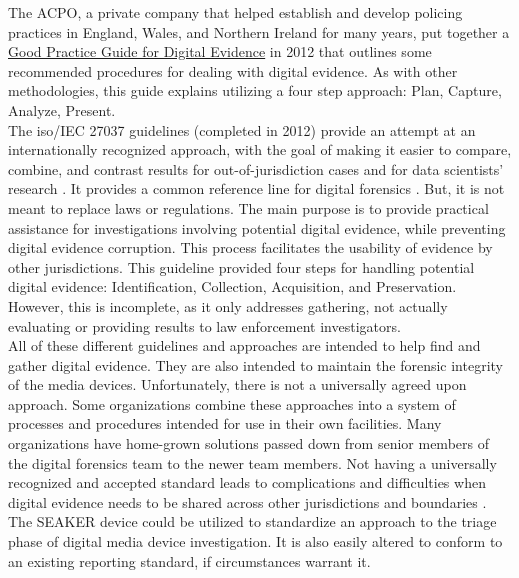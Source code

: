 \documentclass[12pt]{article}
\begin{document}
The ACPO, a private company that helped establish and
develop policing practices in England, Wales, and Northern Ireland for many years,
put together a \uline{Good Practice Guide for Digital Evidence} \cite{williams2012acpo} in 2012 that outlines some
recommended procedures for dealing with digital evidence.  As with other methodologies, this guide
explains utilizing a four step approach: Plan, Capture, Analyze, Present.\\

The \gls{iso}/IEC 27037 guidelines (completed in 2012) provide an attempt at an internationally 
recognized approach,
with the goal of making it easier to compare, combine, and contrast
results for out-of-jurisdiction cases and for data scientists' research \cite{ISO27037}.  It provides a
common reference line for 
digital forensics \cite{ajijola2014review}.  But, it is not meant to replace laws or regulations.
The main purpose is to provide practical
assistance for investigations involving potential digital evidence, while preventing digital
evidence corruption.  This
process facilitates the usability of evidence by other jurisdictions.  This guideline provided
four steps for handling
potential digital evidence: Identification, Collection, Acquisition, and Preservation.  However,
this is incomplete, as
it only addresses gathering, not actually evaluating or providing results to law enforcement
investigators.\\

All of these different guidelines and approaches are intended to help find and gather digital evidence.
They are also intended to maintain the forensic integrity of the media devices.  Unfortunately, there 
is not a universally agreed upon approach. Some organizations combine these approaches
into a system of processes and procedures intended for use in their own facilities.  
Many organizations have home-grown solutions passed down from senior members of the digital forensics
team to the newer team members.  Not having a universally recognized and accepted standard 
leads to complications and difficulties when digital evidence needs to be shared across other
jurisdictions and boundaries \cite{ajijola2014review}.\\

The SEAKER device could be utilized to standardize an approach to the triage phase of 
digital media device investigation.  It is also easily altered to conform to an existing reporting
standard, if circumstances warrant it.\\
\end{document}

